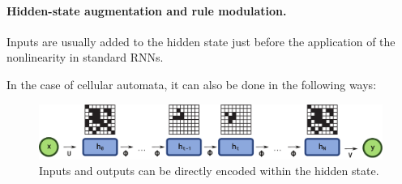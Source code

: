 \paragraph{Hidden-state augmentation and rule modulation.}
Inputs are usually added to the hidden state just before the application of the
nonlinearity in standard RNNs.

In the case of cellular automata, it can also be done in the following ways:

\begin{figure}[ht]
  \centering
  \includegraphics[width=.9\linewidth]{figures/encode_decode.pdf}
  \caption{\label{fig:encode_decode} Inputs and outputs can be directly
    encoded within the hidden state.}
\end{figure}

